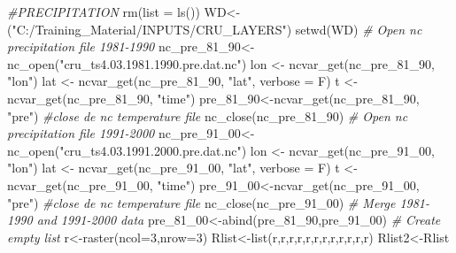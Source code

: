 \documentclass[
  10pt,
  b5paper,
]{book}
\newenvironment{Shaded}{\begin{snugshade}}{\end{snugshade}}
\newcommand{\AttributeTok}[1]{\textcolor[rgb]{0.77,0.63,0.00}{#1}}
\newcommand{\CommentTok}[1]{\textcolor[rgb]{0.56,0.35,0.01}{\textit{#1}}}
\newcommand{\DecValTok}[1]{\textcolor[rgb]{0.00,0.00,0.81}{#1}}
\newcommand{\FunctionTok}[1]{\textcolor[rgb]{0.00,0.00,0.00}{#1}}
\newcommand{\NormalTok}[1]{#1}
\newcommand{\OtherTok}[1]{\textcolor[rgb]{0.56,0.35,0.01}{#1}}
\newcommand{\StringTok}[1]{\textcolor[rgb]{0.31,0.60,0.02}{#1}}
\begin{document}
\begin{Shaded}
\begin{Highlighting}[]
 \CommentTok{\#PRECIPITATION}
 \FunctionTok{rm}\NormalTok{(}\AttributeTok{list =} \FunctionTok{ls}\NormalTok{())}
\NormalTok{WD}\OtherTok{\textless{}{-}}\NormalTok{(}\StringTok{"C:/Training\_Material/INPUTS/CRU\_LAYERS"}\NormalTok{)}
\FunctionTok{setwd}\NormalTok{(WD)}
 \CommentTok{\# Open nc precipitation file 1981{-}1990}
\NormalTok{nc\_pre\_81\_90}\OtherTok{\textless{}{-}}\FunctionTok{nc\_open}\NormalTok{(}\StringTok{"cru\_ts4.03.1981.1990.pre.dat.nc"}\NormalTok{)}
\NormalTok{ lon }\OtherTok{\textless{}{-}} \FunctionTok{ncvar\_get}\NormalTok{(nc\_pre\_81\_90, }\StringTok{"lon"}\NormalTok{)}
\NormalTok{lat }\OtherTok{\textless{}{-}} \FunctionTok{ncvar\_get}\NormalTok{(nc\_pre\_81\_90, }\StringTok{"lat"}\NormalTok{, }\AttributeTok{verbose =}\NormalTok{ F)}
\NormalTok{t }\OtherTok{\textless{}{-}} \FunctionTok{ncvar\_get}\NormalTok{(nc\_pre\_81\_90, }\StringTok{"time"}\NormalTok{)}
\NormalTok{ pre\_81\_90}\OtherTok{\textless{}{-}}\FunctionTok{ncvar\_get}\NormalTok{(nc\_pre\_81\_90, }\StringTok{"pre"}\NormalTok{)}
 \CommentTok{\#close de nc temperature file}
 \FunctionTok{nc\_close}\NormalTok{(nc\_pre\_81\_90) }
 \CommentTok{\# Open nc precipitation file 1991{-}2000}
\NormalTok{nc\_pre\_91\_00}\OtherTok{\textless{}{-}}\FunctionTok{nc\_open}\NormalTok{(}\StringTok{"cru\_ts4.03.1991.2000.pre.dat.nc"}\NormalTok{)}
\NormalTok{ lon }\OtherTok{\textless{}{-}} \FunctionTok{ncvar\_get}\NormalTok{(nc\_pre\_91\_00, }\StringTok{"lon"}\NormalTok{)}
\NormalTok{lat }\OtherTok{\textless{}{-}} \FunctionTok{ncvar\_get}\NormalTok{(nc\_pre\_91\_00, }\StringTok{"lat"}\NormalTok{, }\AttributeTok{verbose =}\NormalTok{ F)}
\NormalTok{t }\OtherTok{\textless{}{-}} \FunctionTok{ncvar\_get}\NormalTok{(nc\_pre\_91\_00, }\StringTok{"time"}\NormalTok{)}
\NormalTok{pre\_91\_00}\OtherTok{\textless{}{-}}\FunctionTok{ncvar\_get}\NormalTok{(nc\_pre\_91\_00, }\StringTok{"pre"}\NormalTok{)}
 \CommentTok{\#close de nc temperature file}
 \FunctionTok{nc\_close}\NormalTok{(nc\_pre\_91\_00) }
 \CommentTok{\# Merge 1981{-}1990 and 1991{-}2000 data }
\NormalTok{ pre\_81\_00}\OtherTok{\textless{}{-}}\FunctionTok{abind}\NormalTok{(pre\_81\_90,pre\_91\_00) }
 \CommentTok{\# Create empty list}
\NormalTok{r}\OtherTok{\textless{}{-}}\FunctionTok{raster}\NormalTok{(}\AttributeTok{ncol=}\DecValTok{3}\NormalTok{,}\AttributeTok{nrow=}\DecValTok{3}\NormalTok{)}
\NormalTok{Rlist}\OtherTok{\textless{}{-}}\FunctionTok{list}\NormalTok{(r,r,r,r,r,r,r,r,r,r,r,r)}
\NormalTok{Rlist2}\OtherTok{\textless{}{-}}\NormalTok{Rlist}

\end{Highlighting}
\end{Shaded}
\end{document}
